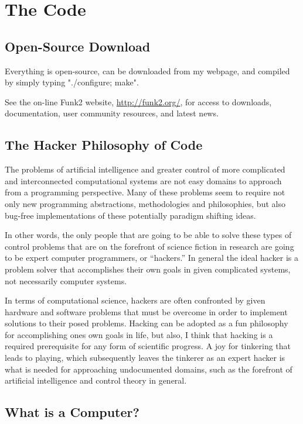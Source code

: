\chapter{The Code}\label{appendix:the_code}

\section{Open-Source Download}

Everything is open-source, can be downloaded from my webpage, and
compiled by simply typing "./configure; make".

See the on-line Funk2 website, \url{http://funk2.org/}, for access to
downloads, documentation, user community resources, and latest news.

\section{The Hacker Philosophy of Code}

The problems of artificial intelligence and greater control of more
complicated and interconnected computational systems are not easy
domains to approach from a programming perspective.  Many of these
problems seem to require not only new programming abstractions,
methodologies and philosophies, but also bug-free implementations of
these potentially paradigm shifting ideas.

In other words, the only people that are going to be able to solve
these types of control problems that are on the forefront of science
fiction in research are going to be expert computer programmers, or
``hackers.''  In general the ideal hacker is a problem solver that
accomplishes their own goals in given complicated systems, not
necessarily computer systems.

In terms of computational science, hackers are often confronted by
given hardware and software problems that must be overcome in order to
implement solutions to their posed problems.  Hacking can be adopted
as a fun philosophy for accomplishing ones own goals in life, but
also, I think that hacking is a required prerequisite for any form of
scientific progress.  A joy for tinkering that leads to playing, which
subsequently leaves the tinkerer as an expert hacker is what is needed
for approaching undocumented domains, such as the forefront of
artificial intelligence and control theory in general.

\section{What is a Computer?}
\label{sec:what_is_a_computer}

